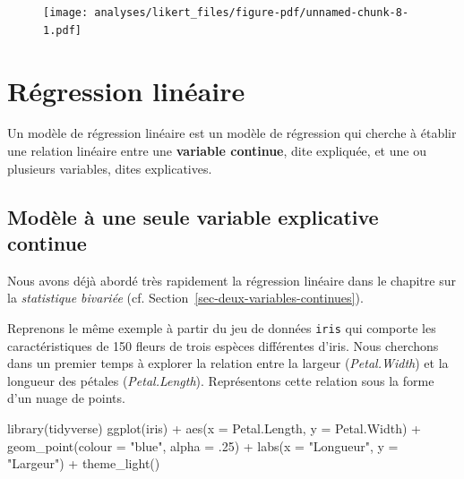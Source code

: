 \documentclass[
  letterpaper,
  DIV=11,
  numbers=noendperiod,
  oneside]{scrreprt}
\newenvironment{Shaded}{\begin{snugshade}}{\end{snugshade}}
\newcommand{\AttributeTok}[1]{\textcolor[rgb]{0.40,0.45,0.13}{#1}}
\newcommand{\DecValTok}[1]{\textcolor[rgb]{0.68,0.00,0.00}{#1}}
\newcommand{\FunctionTok}[1]{\textcolor[rgb]{0.28,0.35,0.67}{#1}}
\newcommand{\NormalTok}[1]{\textcolor[rgb]{0.00,0.23,0.31}{#1}}
\newcommand{\SpecialCharTok}[1]{\textcolor[rgb]{0.37,0.37,0.37}{#1}}
\newcommand{\StringTok}[1]{\textcolor[rgb]{0.13,0.47,0.30}{#1}}
\begin{document}
\begin{figure}[H]

{\centering \texttt{[image: analyses/likert\_files/figure-pdf/unnamed-chunk-8-1.pdf]}

}

\end{figure}

\hypertarget{sec-regression-lineaire}{%
\chapter{Régression linéaire}\label{sec-regression-lineaire}}

Un modèle de régression linéaire est un modèle de régression qui cherche
à établir une relation linéaire entre une \textbf{variable continue},
dite expliquée, et une ou plusieurs variables, dites explicatives.

\hypertarget{sec-regression-lineaire-variable-explicative-continue}{%
\section{Modèle à une seule variable explicative
continue}\label{sec-regression-lineaire-variable-explicative-continue}}

Nous avons déjà abordé très rapidement la régression linéaire dans le
chapitre sur la \emph{statistique bivariée} (cf.
Section~\ref{sec-deux-variables-continues}).

Reprenons le même exemple à partir du jeu de données \texttt{iris} qui
comporte les caractéristiques de 150 fleurs de trois espèces différentes
d'iris. Nous cherchons dans un premier temps à explorer la relation
entre la largeur (\emph{Petal.Width}) et la longueur des pétales
(\emph{Petal.Length}). Représentons cette relation sous la forme d'un
nuage de points.

\begin{Shaded}
\begin{Highlighting}[]
\FunctionTok{library}\NormalTok{(tidyverse)}
\FunctionTok{ggplot}\NormalTok{(iris) }\SpecialCharTok{+}
  \FunctionTok{aes}\NormalTok{(}\AttributeTok{x =}\NormalTok{ Petal.Length, }\AttributeTok{y =}\NormalTok{ Petal.Width) }\SpecialCharTok{+}
  \FunctionTok{geom\_point}\NormalTok{(}\AttributeTok{colour =} \StringTok{"blue"}\NormalTok{, }\AttributeTok{alpha =}\NormalTok{ .}\DecValTok{25}\NormalTok{) }\SpecialCharTok{+}
  \FunctionTok{labs}\NormalTok{(}\AttributeTok{x =} \StringTok{"Longueur"}\NormalTok{, }\AttributeTok{y =} \StringTok{"Largeur"}\NormalTok{) }\SpecialCharTok{+}
  \FunctionTok{theme\_light}\NormalTok{()}
\end{Highlighting}
\end{Shaded}
\end{document}
